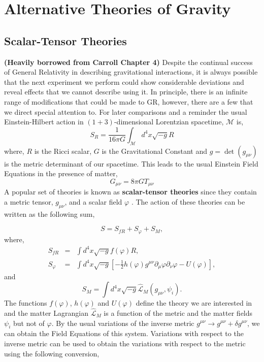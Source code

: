 \chapter{Alternative Theories of Gravity}
\section{Scalar-Tensor Theories}
\textbf{(Heavily borrowed from Carroll Chapter 4)} Despite the continual success of General Relativity in describing gravitational interactions, it is always possible that the next experiment we perform could show considerable deviations and reveal effects that we cannot describe using it. In principle, there is an infinite range of modifications that could be made to GR, however, there are a few that we direct special attention to. For later comparisons and a reminder the usual Einstein-Hilbert action in $(1+3)$-dimensional Lorentzian spacetime, $\mathcal{M}$ is,
\begin{equation}
    S_{R} = \frac{1}{16\pi G}\int_{\mathcal{M}} d^4 x\sqrt{-g}R
\end{equation}
where, $R$ is the Ricci scalar, $G$ is the Gravitational Constant and $g = \det(g_{\mu\nu})$ is the metric determinant of our spacetime. This leads to the usual Einstein Field Equations in the presence of matter, 
\begin{equation}\label{efes}
    G_{\mu\nu} = 8\pi GT_{\mu\nu}
\end{equation}
A popular set of theories is known as \textbf{scalar-tensor theories} since they contain a metric tensor, $g_{\mu\nu}$, and a scalar field $\varphi$ \citep{carrolGravity}. The action of these theories can be written as the following sum, 

\begin{equation}
    S = S_{fR} + S_{\varphi} + S_M,
\end{equation}
where,
\begin{eqnarray}\label{st-actions}
    S_{fR} &=& \int d^4x\sqrt{-g}f(\varphi)R,\\
    S_{\varphi} &=& \int d^4x\sqrt{-g}\left[-\frac{1}{2}h(\varphi)g^{\mu\nu}\partial_{\mu}\varphi\partial_{\nu}\varphi - U(\varphi)\right],
\end{eqnarray}
and 
\begin{equation}\label{matter-action}
    S_M = \int d^4x\sqrt{-g} \hat{\mathcal{L}}_M(g_{\mu\nu}, \psi_i).
\end{equation}
The functions $f(\varphi)$, $h(\varphi)$ and $U(\varphi)$ define the theory we are interested in and the matter Lagrangian $\hat{\mathcal{L}}_M$ is a function of the metric and the matter fields $\psi_i$ but not of $\varphi$. By the usual variations of the inverse metric $g^{\mu\nu} \rightarrow g^{\mu\nu}  + \delta g^{\mu\nu} $, we can obtain the Field Equations of this system. Variations with respect to the inverse metric can be used to obtain the variations with respect to the metric using the following conversion,

